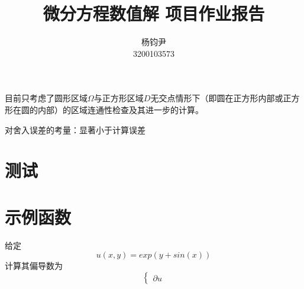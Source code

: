 \documentclass{ctexart}
\title{微分方程数值解 项目作业报告}
\author{杨钧尹\\ \small{3200103573}}
\date{}
\begin{document}
\maketitle


目前只考虑了圆形区域$\Omega$与正方形区域$D$无交点情形下（即圆在正方形内部或正方形在圆的内部）的区域连通性检查及其进一步的计算。

对舍入误差的考量：显著小于计算误差


\section{测试}
\section{示例函数}
给定
$$u(x,y)=exp(y+sin(x))$$
计算其偏导数为
$$\left\{\begin{array}{l}
    \partial u
\end{array}\right.$$
\end{document}
